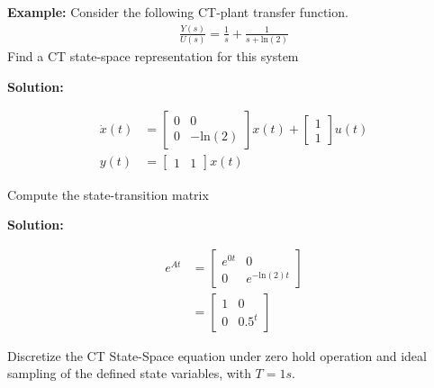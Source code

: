 \documentclass[twoside]{article}
\begin{document}
\textbf{Example:} Consider the following CT-plant transfer function. 
%
\begin{align*}
  \frac{Y(s)}{U(s)} = \frac{1}{s} + \frac{1}{s+\mathrm{ln}(2)}
\end{align*}
%
Find a CT state-space representation for this system


\textbf{Solution:}

\begin{align*}
 \dot{x}(t) &= \left[ \begin{array}{cc} 0 & 0 \\ 0 & -
         \mathrm{ln}(2) \end{array} \right] x(t)
    + \left[ \begin{array}{c} 1 \\ 1 \end{array} \right] u(t)
 \\
  y(t) &= \left[ \begin{array}{cc} 1 & 1 \end{array} \right] x(t)
\end{align*}

Compute the state-transition matrix

\textbf{Solution:}

\begin{align*}
 e^{A t} &= \left[ 
\begin{array}{cc} 
                     e^{0 t} & 0 \\ 0 & e^{-\mathrm{ln}(2) t } 
\end{array} \right] 
\\ 
 &= \left[ 
\begin{array}{cc} 
             1 & 0 \\ 0 & 0.5^t 
\end{array} \right] 
\end{align*}

Discretize the CT State-Space equation under zero hold operation 
and ideal sampling of the defined state variables, with $T = 1 s$.
\end{document}
